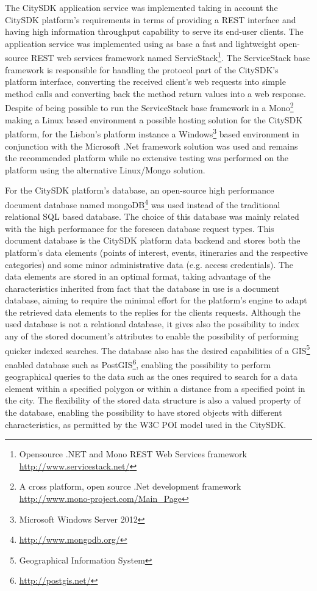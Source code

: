 \documentclass[times]{ettauth}
\begin{document}
The CitySDK application service was implemented taking in account the CitySDK platform's requirements in terms of providing a REST interface and having high information throughput capability to serve its end-user clients. The application service was implemented using as base a fast and lightweight open-source REST web services framework named ServicStack\footnote{Opensource .NET and Mono REST Web Services framework \url{http://www.servicestack.net/}}. The ServiceStack base framework is responsible for handling the protocol part of the CitySDK's platform interface, converting the received client's web requests into simple method calls and converting back the method return values into a web response. Despite of being possible to run the ServiceStack base framework in a Mono\footnote{A cross platform, open source .Net development framework \url{http://www.mono-project.com/Main_Page}} making a Linux based environment a possible hosting solution for the CitySDK platform, for the Lisbon's platform instance a Windows\footnote{Microsoft Windows Server 2012} based environment in conjunction with the Microsoft .Net framework solution was used and remains the recommended platform while no extensive testing was performed on the platform using the alternative Linux/Mongo solution.

For the CitySDK platform's database, an open-source high performance document database named mongoDB\footnote{\url{http://www.mongodb.org/}} was used instead of the traditional relational SQL based database. The choice of this database was mainly related with the high performance for the foreseen database request types. This document database is the CitySDK platform data backend and stores both the platform's data elements (points of interest, events, itineraries and the respective categories) and some minor administrative data (e.g. access credentials). The data elements are stored in an optimal format, taking advantage of the characteristics inherited from fact that the database in use is a document database, aiming to require the minimal effort for the platform's engine to adapt the retrieved data elements to the replies for the clients requests. Although the used database is not a relational database, it gives also the possibility to index any of the stored document's attributes to enable the possibility of performing quicker indexed searches. The database also has the desired capabilities of a GIS\footnote{Geographical Information System} enabled database such as PostGIS\footnote{\url{http://postgis.net/}}, enabling the possibility to perform geographical queries to the data such as the ones required to search for a data element within a specified polygon or within a distance from a specified point in the city. The flexibility of the stored data structure is also a valued property of the database, enabling the possibility to have stored objects with different characteristics, as permitted by the W3C POI model used in the CitySDK.
\end{document}
